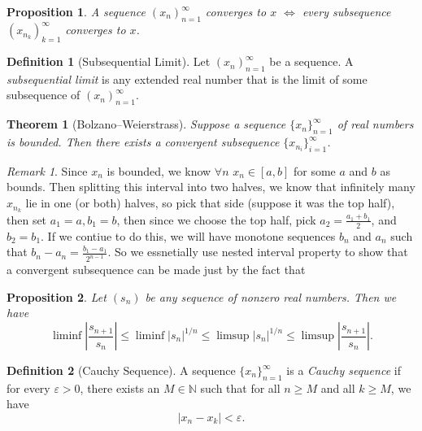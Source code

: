 \documentclass{article}
\newtheorem{theorem}{Theorem}[section]
\newtheorem{proposition}{Proposition}[section]
\theoremstyle{definition}
\newtheorem{definition}{Definition}[section]
\theoremstyle{remark}
\newtheorem{remark}{Remark}[section]
\begin{document}
\begin{proposition}
A sequence $ (x_n)^\infty_{n=1}$ converges to $x$ $\iff$ every subsequence $ (x_{n_k})^\infty_{k = 1}$ converges to $x$.
\end{proposition}





\begin{definition}[Subsequential Limit]
Let  $ (x_n)^\infty_{n=1}$ be a sequence. A \textit{subsequential limit} is any extended real number that is the limit of some subsequence of  $ (x_n)^\infty_{n=1}$.

\end{definition}






\begin{theorem}[Bolzano–Weierstrass] \label{thm: Bolzano-Weierstrass}
Suppose a sequence \( \{x_n\}_{n=1}^{\infty} \) of real numbers is bounded. Then there exists a convergent subsequence \( \{x_{n_i}\}_{i=1}^{\infty} \).
\end{theorem}
\begin{remark}
Since $x_n$ is bounded, we know $\forall n$ $x_n \in [a,b]$ for some $a$ and $b$ as bounds.
Then splitting this interval into two halves, we know that infinitely many 
$x_{n_k}$ lie in one (or both) halves, so pick that side (suppose it was the top half), then set
$a_1 = a, b_1 = b$, then since we choose the top half, pick $a_2 = \frac{a_1 + b_1}{2}$, and $b_2 = b_1$.
If we contiue to do this, we will have monotone sequences $b_n$ and $a_n$ such that 
$b_n - a_n = \frac{b_1 - a_1}{2^{n-1}}$. So we essnetially use nested interval property to show
that a convergent subsequence can be made just by the fact that 
\end{remark}


\begin{proposition}
Let $(s_n)$ be any sequence of nonzero real numbers. Then we have
\[
\liminf \left| \frac{s_{n+1}}{s_n} \right| 
\leq \liminf |s_n|^{1/n} 
\leq \limsup |s_n|^{1/n} 
\leq \limsup \left| \frac{s_{n+1}}{s_n} \right|.
\]

\end{proposition}









\begin{definition}[Cauchy Sequence]\label{def:cauchy_sequence}
A sequence \( \{x_n\}_{n=1}^{\infty} \) is a \textit{Cauchy sequence} if for every \( \varepsilon > 0 \), there exists an \( M \in \mathbb{N} \) such that for all \( n \geq M \) and all \( k \geq M \), we have
\[
|x_n - x_k| < \varepsilon.
\]
\end{definition}
\end{document}

